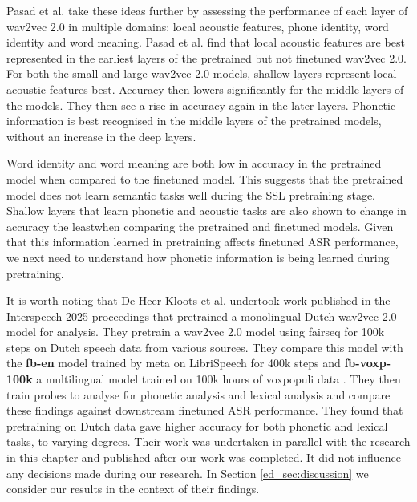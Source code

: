 Pasad et al. \cite{pasad2021layer} take these ideas further by assessing the performance of each layer of wav2vec 2.0  in multiple domains: local acoustic features, phone identity, word identity and word meaning. Pasad et al. find that local acoustic features are best represented in the earliest layers of the pretrained but not finetuned wav2vec 2.0. For both the small and large wav2vec 2.0 models, shallow layers represent local acoustic features best. Accuracy then lowers significantly for the middle layers of the  models. They then see a rise in accuracy again in the later layers. Phonetic information is best recognised in the middle layers of the pretrained models, without an increase in the deep layers.

Word identity and word meaning are both low in accuracy in the pretrained model when compared to the finetuned model. This suggests that the pretrained model does not learn semantic tasks well during the SSL pretraining stage. Shallow layers that learn phonetic and acoustic tasks are also shown to change in accuracy the leastwhen comparing the pretrained and finetuned models. Given that this information learned in pretraining affects finetuned ASR performance, we next need to understand how phonetic information is being learned during pretraining.

It is worth noting that De Heer Kloots et al. \cite{deheerkloots25_interspeech} undertook work published in the Interspeech 2025 proceedings that pretrained a monolingual Dutch wav2vec 2.0 model for analysis. They pretrain a wav2vec 2.0 model using fairseq \cite{ott-etal-2019-fairseq} for 100k steps on Dutch speech data from various sources. They compare this model with the \textbf{fb-en} model trained by meta on LibriSpeech for 400k steps and \textbf{fb-voxp-100k} a multilingual model trained on 100k hours of voxpopuli data \cite{wang-etal-2021-voxpopuli}. They then train probes to analyse for phonetic analysis and lexical analysis and compare these findings against downstream finetuned ASR performance. They found that pretraining on Dutch data gave higher accuracy for  both phonetic and lexical tasks, to varying degrees. Their work was undertaken in parallel with the research in this chapter and published after our work was completed. It did not influence any decisions made during our research. In Section \ref{ed_sec:discussion} we consider our results in the context of their findings. 

